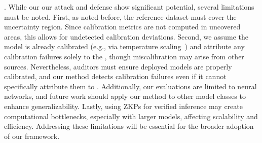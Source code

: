 . While our our attack and defense show significant potential, several limitations must be noted. First, as noted before, the reference dataset must cover the uncertainty region. Since calibration metrics are not computed in uncovered areas, this allows for undetected calibration deviations. Second, we assume the model is already calibrated (e.g., via temperature scaling~\citep{guo2017calibration}) and attribute any calibration failures solely to the \attack, though miscalibration may arise from other sources. Nevertheless, auditors must ensure deployed models are properly calibrated, and our method detects calibration failures even if it cannot specifically attribute them to \attack. Additionally, our evaluations are limited to neural networks, and future work should apply our method to other model classes to enhance generalizability. Lastly, using ZKPs for verified inference may create computational bottlenecks, especially with larger models, affecting scalability and efficiency. Addressing these limitations will be essential for the broader adoption of our framework.

